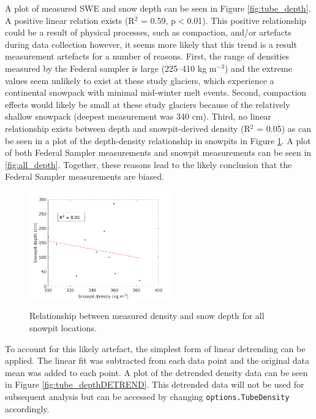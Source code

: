 \documentclass[12pt]{article}
\begin{document}
A plot of measured SWE and snow depth can be seen in Figure \ref{fig:tube_depth}. A positive linear relation exists (R$^2$ = 0.59, p$<$0.01). This positive relationship could be a result of physical processes, such as compaction, and/or artefacts during data collection however, it seems more likely that this trend is a result measurement artefacts for a number of reasons. First, the range of densities measured by the Federal sampler is large (225--410 kg m$^{-3}$) and the extreme values seem unlikely to exist at these study glaciers, which experience a continental snowpack with minimal mid-winter melt events. Second, compaction effects would likely be small at these study glaciers because of the relatively shallow snowpack (deepest measurement was 340 cm). Third, no linear relationship exists between depth and snowpit-derived density (R$^2$ = 0.05) as can be seen in a plot of the depth-density relationship in snowpits in Figure \ref{fig:pit_depth}. A plot of both Federal Sampler measurements and snowpit measurements can be seen in \ref{fig:all_depth}. Together, these reasons lead to the likely conclusion that the Federal Sampler measurements are biased. 
 
 \begin{figure} 
	\includegraphics[width =0.55\textwidth]{DepthDensity_SP.png}\\
	\caption{Relationship between measured density and snow depth for all snowpit locations.}
	\label{fig:pit_depth}
\end{figure}

To account for this likely artefact, the simplest form of linear detrending can be applied. The linear fit was subtracted from each data point and the original data mean was added to each point. A plot of the detrended density data can be seen in Figure \ref{fig:tube_depthDETREND}. This detrended data will not be used for subsequent analysis but can be accessed by changing \texttt{options.TubeDensity} accordingly.
\end{document}
